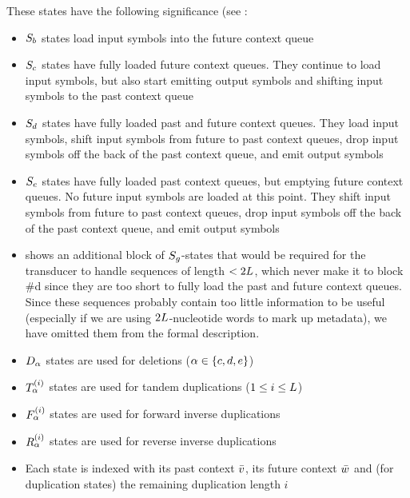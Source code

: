 \documentclass[english]{article}
\begin{document}
These states have the following significance (see :
\begin{itemize}
  \item ${S}_{b}$ states load input symbols into the future context queue
  \item ${S}_{c}$ states have fully loaded future context queues. They continue to load input symbols, but also start emitting output symbols and shifting input symbols to the past context queue
  \item ${S}_{d}$ states have fully loaded past and future context queues. They load input symbols, shift input symbols from future to past context queues, drop input symbols off the back of the past context queue, and emit output symbols
  \item ${S}_{e}$ states have fully loaded past context queues, but emptying future context queues. No future input symbols are loaded at this point. They shift input symbols from future to past context queues, drop input symbols off the back of the past context queue, and emit output symbols
  \item {} shows an additional block of ${S}_{g}$-states that would be required for the transducer to handle sequences of length $<2L$, which never make it to block \#d since they are too short to fully load the past and future context queues. Since these sequences probably contain too little information to be useful (especially if we are using $2L$-nucleotide words to mark up metadata), we have omitted them from the formal description.
  \item ${D}_{\alpha}$ states are used for deletions ($\alpha \in \{ c, d, e \}$)
  \item ${T}_{\alpha}^{(i)}$ states are used for tandem duplications ($1 \leq i \leq L$)
  \item ${F}_{\alpha}^{(i)}$ states are used for forward inverse duplications
  \item ${R}_{\alpha}^{(i)}$ states are used for reverse inverse duplications
  \item Each state is indexed with its past context $\bar{v}$, its future context $\bar{w}$ and (for duplication states) the remaining duplication length $i$
\end{itemize}
\end{document}
